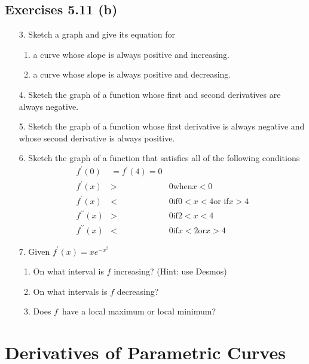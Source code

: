 \subsection{Exercises 5.11 (b)}
\begin{enumerate}
\item [3.] Sketch a graph and give its equation for 


\begin{enumerate}
\item a curve whose slope is always positive and increasing. 

\item a
curve whose slope is always positive and decreasing. \end{enumerate}


\item [4.]
Sketch the graph of a function whose first and second derivatives are always negative. 

\item [5.]
Sketch the graph of a function whose first derivative is always negative and whose second derivative is always positive. 

\item [6.]
Sketch the graph of a function that satisfies all of the following conditions
\begin{align*}f^{ \prime } (0) &  = f^{ \prime } (4) =0 \\
f^{ \prime } (x) &  > & 0\text{when}x <0 \\
f^{ \prime } (x) &  < & 0\text{if}0 <x <4\text{or if}x >4 \\
f^{ \prime  \prime } (x) &  > & 0\text{if}2 <x <4 \\
f^{ \prime  \prime } (x) &  < & 0\text{if}x <2\text{or}x >4\end{align*}

\item [7.] Given $f^{ \prime } (x) =x e^{ -x^{2}}$ 


\begin{enumerate}
\item On what interval is $f$ increasing? (Hint: use Desmos) 

\item On what intervals is $f$ decreasing? 

\item Does $f$\ have a local maximum or local minimum? \end{enumerate}
\end{enumerate}


\section{Derivatives of Parametric Curves}


